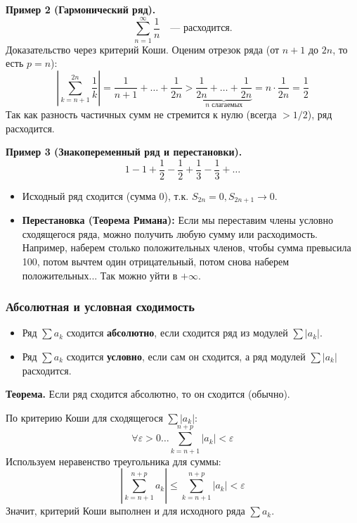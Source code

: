 \textbf{Пример 2 (Гармонический ряд).}
\[ \sum_{n=1}^\infty \frac{1}{n} \quad \text{— расходится.} \]
Доказательство через критерий Коши. Оценим отрезок ряда (от $n+1$ до $2n$, то есть $p=n$):
\[ \left| \sum_{k=n+1}^{2n} \frac{1}{k} \right| = \frac{1}{n+1} + \dots + \frac{1}{2n} > \underbrace{\frac{1}{2n} + \dots + \frac{1}{2n}}_{n \text{ слагаемых}} = n \cdot \frac{1}{2n} = \frac{1}{2} \]
Так как разность частичных сумм не стремится к нулю (всегда $> 1/2$), ряд расходится.

\textbf{Пример 3 (Знакопеременный ряд и перестановки).}
\[ 1 - 1 + \frac{1}{2} - \frac{1}{2} + \frac{1}{3} - \frac{1}{3} + \dots \]
\begin{itemize}
    \item Исходный ряд сходится (сумма 0), т.к. $S_{2n} = 0, S_{2n+1} \to 0$.
    \item \textbf{Перестановка (Теорема Римана):} Если мы переставим члены условно сходящегося ряда, можно получить любую сумму или расходимость.
    Например, наберем столько положительных членов, чтобы сумма превысила 100, потом вычтем один отрицательный, потом снова наберем положительных... Так можно уйти в $+\infty$.
\end{itemize}

\subsubsection*{Абсолютная и условная сходимость}
\begin{tcolorbox}[title=Определения]
    \begin{itemize}
        \item Ряд $\sum a_k$ сходится \textbf{абсолютно}, если сходится ряд из модулей $\sum |a_k|$.
        \item Ряд $\sum a_k$ сходится \textbf{условно}, если сам он сходится, а ряд модулей $\sum |a_k|$ расходится.
    \end{itemize}
\end{tcolorbox}

\textbf{Теорема.} Если ряд сходится абсолютно, то он сходится (обычно).
\begin{tcolorbox}[title=Доказательство]
    По критерию Коши для сходящегося $\sum |a_k|$:
    \[ \forall \varepsilon > 0 \dots \sum_{k=n+1}^{n+p} |a_k| < \varepsilon \]
    Используем неравенство треугольника для суммы:
    \[ \left| \sum_{k=n+1}^{n+p} a_k \right| \leq \sum_{k=n+1}^{n+p} |a_k| < \varepsilon \]
    Значит, критерий Коши выполнен и для исходного ряда $\sum a_k$.
\end{tcolorbox}

